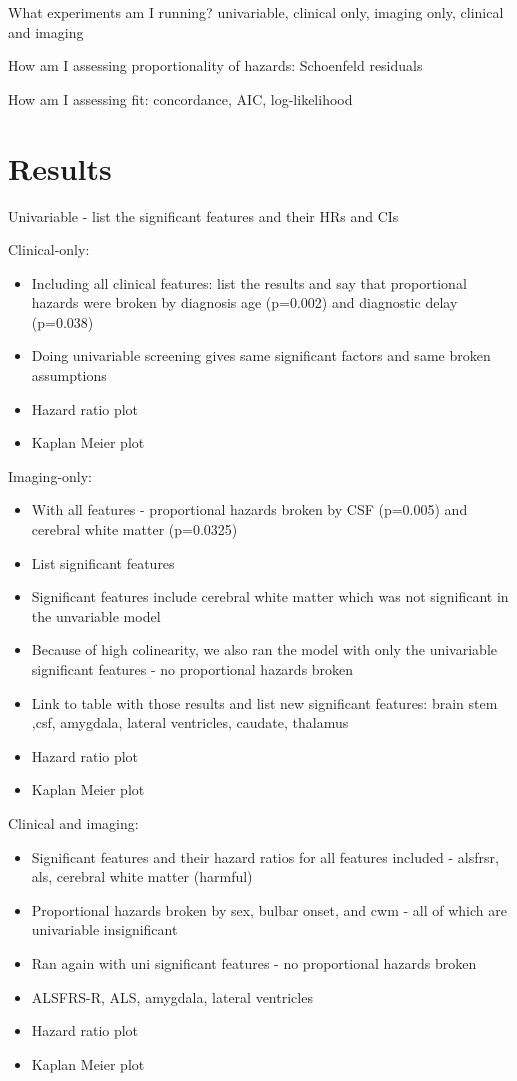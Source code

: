 What experiments am I running? univariable, clinical only, imaging only, clinical and imaging

How am I assessing proportionality of hazards: Schoenfeld residuals

How am I assessing fit: concordance, AIC, log-likelihood

\section{Results}

Univariable
- list the significant features and their HRs and CIs

Clinical-only:
\begin{itemize}
    \item Including all clinical features: list the results and say that proportional hazards were broken by diagnosis age (p=0.002) and diagnostic delay (p=0.038)
    \item Doing univariable screening gives same significant factors and same broken assumptions
    \item Hazard ratio plot
    \item Kaplan Meier plot
\end{itemize}

Imaging-only:
\begin{itemize}
    \item With all features - proportional hazards broken by CSF (p=0.005) and cerebral white matter (p=0.0325)
    \item List significant features
    \item Significant features include cerebral white matter which was not significant in the unvariable model
    \item Because of high colinearity, we also ran the model with only the univariable significant features - no proportional hazards broken
    \item Link to table with those results and list new significant features: brain stem ,csf, amygdala, lateral ventricles, caudate, thalamus
    \item Hazard ratio plot
    \item Kaplan Meier plot
\end{itemize}

Clinical and imaging:
\begin{itemize}
    \item Significant features and their hazard ratios for all features included - alsfrsr, als, cerebral white matter (harmful)
    \item Proportional hazards broken by sex, bulbar onset, and cwm - all of which are univariable insignificant
    \item Ran again with uni significant features - no proportional hazards broken
    \item ALSFRS-R, ALS, amygdala, lateral ventricles
    \item Hazard ratio plot
    \item Kaplan Meier plot
\end{itemize}

